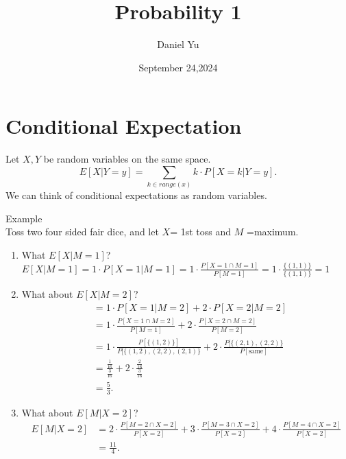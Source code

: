 \documentclass[a4paper]{article}
\title{\Huge{Probability 1}}
\author{\huge{Daniel Yu}}
\date{September 24,2024}
\begin{document}
\maketitle
\newpage%
\tableofcontents
\pagebreak
  
\section{Conditional Expectation}
\begin{definition}
  Let $X,Y$ be random variables on the same space.
   \[
     E[X|Y=y] = \sum_{k \in range(x)} k \cdot P[X=k|Y=y]
  .\]
  We can think of conditional expectations as random variables.
\end{definition}
\begin{note}{Example}\\
  Toss two four sided fair dice, and let $X$= 1st toss and  $M$ =maximum. 

  \begin{enumerate}
    \item What $E[X|M=1]$?  
      $E[X|M=1] = 1 \cdot P[X=1 | M=1]= 1 \cdot \frac{P[X=1 \cap M=1]}{P[M=1]} = 
      1 \cdot \frac{\{(1,1)\}}{\{(1,1)\} } =1$
    \item What about $E[X|M=2]$? 
      \begin{align*}
        &= 1 \cdot P[X=1 | M =2] + 2 \cdot P[X=2|M=2] \\
        &= 1 \cdot \frac{P[X=1 \cap M=2]}{P[M=1]} + 2 \cdot \frac{P[X=2 \cap M=2]}{P[M=2]} \\
        &= 1 \cdot \frac{P[\{(1,2)\}]}{P[\{(1,2),(2,2),(2,1)\}} + 2 \cdot \frac{P[\{(2,1),(2,2)\}}{P[\text{same}]} \\
        &= \frac{\frac{1}{16}}{\frac{3}{16}} + 2 \cdot \frac{\frac{2}{16}}{\frac{3}{16}} \\
        &= \frac{5}{3}
      .\end{align*}
    \item What about $E[M | X=2]$?
      \begin{align*}
        E[M|X=2] &= 2 \cdot \frac{P[M =2 \cap X =2]}{P[X=2]} + 3 \cdot \frac{P[M=3 \cap X=2]}{P[X=2]} + 4 \cdot \frac{P[M=4 \cap X=2]}{P[X=2]} \\
                 &= \frac{11}{4}
      .\end{align*}
  \end{enumerate}
 \end{note}
\end{document}
